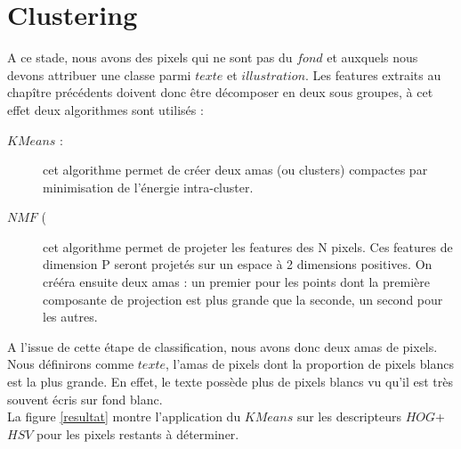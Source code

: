 \documentclass{book}
\begin{document}
\chapter{Clustering}

A ce stade, nous avons des pixels qui ne sont pas du $fond$ et auxquels nous devons attribuer une classe parmi $texte$ et $illustration$.
Les features extraits au chapître précédents doivent donc être décomposer en deux sous groupes, à cet effet deux algorithmes sont utilisés :
\begin{description} %

\item[$KMeans$ :] cet algorithme permet de créer deux amas (ou clusters) compactes par minimisation de l'énergie intra-cluster.
\item[$NMF$ (\begin{itshape}Non-Negative Matrix Factorization\end{itshape}) :] cet algorithme permet de projeter les features 
des N pixels. Ces features de dimension P seront projetés sur un espace à 2 dimensions positives. On crééra ensuite
deux amas : un premier pour les points dont la première composante de projection est plus grande que la seconde, un second pour les autres.

\end{description}

A l'issue de cette étape de classification, nous avons donc deux amas de pixels. Nous définirons comme $texte$, l'amas de pixels dont la proportion de pixels blancs
est la plus grande. En effet, le texte possède plus de pixels blancs vu qu'il est très souvent écris sur fond blanc.\\
La figure \ref{resultat} montre l'application du $KMeans$ sur les descripteurs $HOG$+$HSV$ pour les pixels restants à déterminer.
\end{document}
